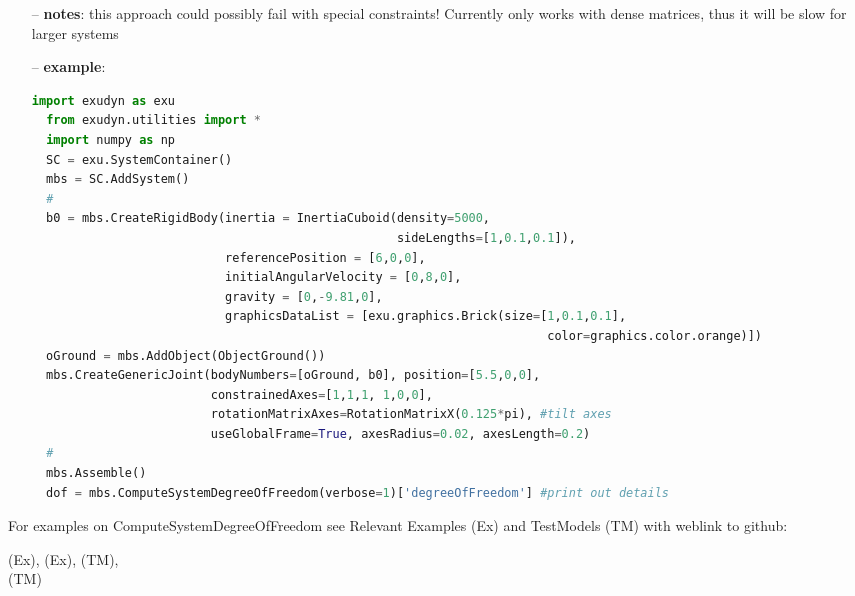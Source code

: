 \begin{itemize}[leftmargin=0.7cm]
\item[--]
{\bf notes}: this approach could possibly fail with special constraints! Currently only works with dense matrices, thus it will be slow for larger systems
\item[--]
{\bf example}: \vspace{-12pt}\ei\begin{lstlisting}[language=Python, xleftmargin=36pt]
  import exudyn as exu
  from exudyn.utilities import *
  import numpy as np
  SC = exu.SystemContainer()
  mbs = SC.AddSystem()
  #
  b0 = mbs.CreateRigidBody(inertia = InertiaCuboid(density=5000,
                                                   sideLengths=[1,0.1,0.1]),
                           referencePosition = [6,0,0],
                           initialAngularVelocity = [0,8,0],
                           gravity = [0,-9.81,0],
                           graphicsDataList = [exu.graphics.Brick(size=[1,0.1,0.1],
                                                                        color=graphics.color.orange)])
  oGround = mbs.AddObject(ObjectGround())
  mbs.CreateGenericJoint(bodyNumbers=[oGround, b0], position=[5.5,0,0],
                         constrainedAxes=[1,1,1, 1,0,0],
                         rotationMatrixAxes=RotationMatrixX(0.125*pi), #tilt axes
                         useGlobalFrame=True, axesRadius=0.02, axesLength=0.2)
  #
  mbs.Assemble()
  dof = mbs.ComputeSystemDegreeOfFreedom(verbose=1)['degreeOfFreedom'] #print out details
\end{lstlisting}\vspace{-24pt}\bi\item[]\vspace{-24pt}\vspace{12pt}\end{itemize}
%

%
\noindent For examples on ComputeSystemDegreeOfFreedom see Relevant Examples (Ex) and TestModels (TM) with weblink to github:
\bi
 \item \footnotesize {} (Ex), 
 (Ex), 
 (TM), 
\\  (TM)
\ei

%
